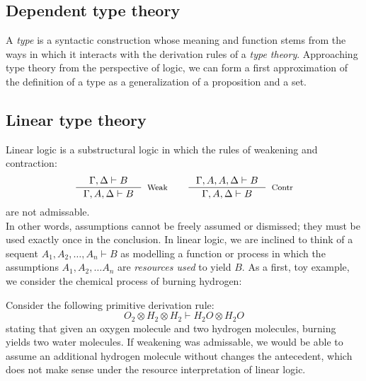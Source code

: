 \subsection{Dependent type theory}
A \textit{type} is a syntactic construction whose meaning and function stems from the ways in which it interacts with the derivation rules of a \textit{type theory}. Approaching type theory from the perspective of logic, we can form a first approximation of the definition of a type as a generalization of a proposition and a set.
\subsection{Linear type theory}
Linear logic is a substructural logic in which the rules of weakening and contraction:
\[
  \begin{split}
    \inference{\Gamma, \Delta \vdash B}{\Gamma, A, \Delta \vdash B}[Weak] \quad \quad 
    \inference{\Gamma, A, A, \Delta \vdash B}{\Gamma, A, \Delta \vdash B}[Contr]
    \end{split}
\]
are not admissable.\\
In other words, assumptions cannot be freely assumed or dismissed; they must be used exactly once in the conclusion. In linear logic, we are inclined to think of a sequent $A_1, A_2, \dots, A_n \vdash B$ as modelling a function or process in which the assumptions $A_1, A_2, \dots A_n$ are \textit{resources used} to yield $B$. As a first, toy example, we consider the chemical process of burning hydrogen:
\begin{expl}\label{burn}
Consider the following primitive derivation rule: 
\[
  O_2 \otimes H_2 \otimes H_2 \vdash H_2O \otimes H_2O
\]
stating that given an oxygen molecule and two hydrogen molecules, burning yields two water molecules. If weakening was admissable, we would be able to assume an additional hydrogen molecule without changes the antecedent, which does not make sense under the resource interpretation of linear logic.\\
\end{expl}

